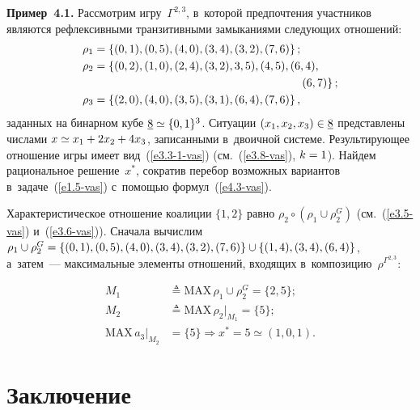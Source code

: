 \begin{multicols}{2}
    
    \textbf{Пример~4.1.} Рас\-смот\-рим игру~$\Gamma^{2,3}$, в~которой 
предпочтения участников являются рефлексивными транзитивными замыканиями 
сле\-ду\-ющих отношений: 
    \begin{align*}
    \rho_1&= \{ (0,1), (0,5), (4,0), (3,4), (3,2), (7,6)\}\,;\\
    \rho_2 &= \{ (0,2), (1,0), (2,4), (3,2), 3,5), (4,5), (6,4),\\
    &\hspace*{65mm} (6,7)\}\,;\\
    \rho_3 &= \{ (2,0), (4,0), (3,5), (3,1), (6,4), (7,6)\}\,,
    \end{align*}
заданных на бинарном кубе $\underline{8}\hm\simeq \{0,1\}^3$. Ситуации 
$(x_1,x_2,x_3)\hm\in \underline{8}$ пред\-став\-ле\-ны чис\-ла\-ми $x\hm\simeq x_1\hm+ 
2x_2\hm+ 4x_3$, записанными в~двоичной сис\-те\-ме. Ре\-зуль\-ти\-ру\-ющее отношение 
игры имеет вид~(\ref{e3.3-1-vas}) (см.~(\ref{e3.8-vas}), $k\hm=1$). Найдем 
рациональное решение~$x^*$, со\-кра\-тив перебор воз\-мож\-ных вариантов 
в~задаче~(\ref{e1.5-vas}) с~по\-мощью формул~(\ref{e4.3-vas}). 
    
    Характеристическое отношение коалиции $\{1,2\}$ равно $\rho_2\circ 
(\rho_1\cup \rho_2^G)$ (см.~(\ref{e3.5-vas}) и~(\ref{e3.6-vas})). Сначала вы\-чис\-лим 
$\rho_1\cup \rho_2^G \hm= \{ (0,1), (0,5), (4,0), (3,4), (3,2),\linebreak (7,6)\} \hm\cup \{ (1,4), (3,4), 
(6,4)\}$, а~затем~--- максимальные элементы отношений, входящих 
в~композицию~$\rho^{\Gamma^{2,3}}$: 

\vspace*{-3pt}

\noindent
     \begin{align*}
     M_1&\triangleq \mathrm{MAX}\, \rho_1\cup \rho_2^G =\{ 2,5\};\\
     M_2&\triangleq \mathrm{MAX}\,\rho_2\vert_{M_1} =\{5\};\\
     \mathrm{MAX}\, a_3\vert_{M_2} &=\{5\}\Rightarrow x^* =5\simeq (1,0,1).
   \end{align*}
   
   \vspace*{-10pt}

\section{Заключение}

\vspace*{-1pt}


\end{multicols}

